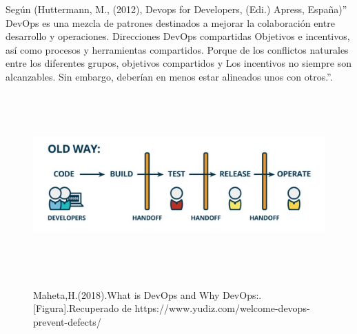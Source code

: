 \documentclass[preprint,12pt]{elsarticle}
\begin{document}
Según (Huttermann, M., (2012), Devops for Developers, (Edi.) Apress, España)” DevOps es una mezcla de patrones destinados a mejorar la colaboración entre desarrollo y operaciones. Direcciones DevOps compartidas Objetivos e incentivos, así como procesos y herramientas compartidos. Porque de los conflictos naturales entre los diferentes grupos, objetivos compartidos y Los incentivos no siempre son alcanzables. Sin embargo, deberían en menos estar alineados unos con otros.”.
\begin{figure}[H]
				\begin{center}
					\includegraphics[width=12cm,height=7cm]{./IMAGENES/devops1}
				\end{center}
Maheta,H.(2018).What is DevOps and Why DevOps:.[Figura].Recuperado de 
https://www.yudiz.com/welcome-devops-prevent-defects/

			\end{figure}
\end{document}
